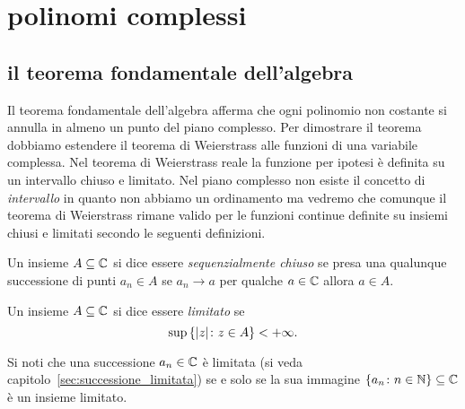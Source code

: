\section{polinomi complessi}
\label{ch:ancora_polinomi}

\subsection{il teorema fondamentale dell'algebra}

Il teorema fondamentale dell'algebra afferma che ogni polinomio non costante 
si annulla in almeno un punto del piano complesso.
Per dimostrare il teorema dobbiamo estendere il teorema 
di Weierstrass alle funzioni di una variabile complessa.
Nel teorema di Weierstrass reale la funzione per ipotesi è definita su un intervallo
chiuso e limitato. 
Nel piano complesso non esiste il concetto di \emph{intervallo} in quanto non abbiamo 
un ordinamento ma vedremo che comunque il teorema di Weierstrass rimane valido per 
le funzioni continue definite su insiemi chiusi e limitati secondo le seguenti definizioni.

\begin{definition}
Un insieme $A\subseteq {\mathbb C}$ si dice
essere \emph{sequenzialmente chiuso}
%
%
se presa una qualunque successione
di punti $a_n\in A$ se $a_n \to a$ per qualche $a\in {\mathbb C}$
allora $a\in A$.
\end{definition}

\begin{definition}[limitatezza]
Un insieme $A\subseteq {\mathbb C}$ si dice essere \emph{limitato}%
%
se
\[
  \sup {\left\{  {\left|z\right|}\colon z \in A \right\}} < +\infty.
\]
\end{definition}

Si noti che una successione $a_n\in {\mathbb C}$ 
è limitata (si veda capitolo~\ref{sec:successione_limitata})
se e solo se la sua immagine ${\left\{ a_n\colon n\in {\mathbb N} \right\}}\subseteq {\mathbb C}$
è un insieme limitato.

